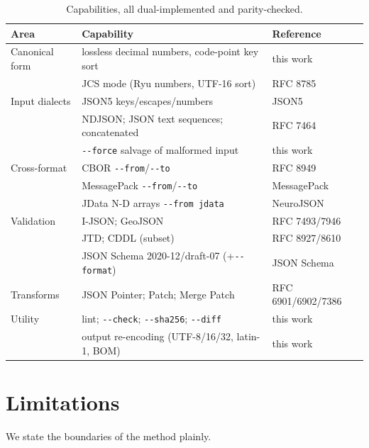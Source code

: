 \documentclass[11pt]{article}
\newcommand{\code}[1]{\texttt{#1}}
\begin{document}
\begin{table}[t]
\centering
\caption{Capabilities, all dual-implemented and parity-checked.}
\label{tab:features}
\small
\begin{tabular}{@{}lll@{}}
\toprule
Area & Capability & Reference \\
\midrule
Canonical form & lossless decimal numbers, code-point key sort & this work \\
                & JCS mode (Ryu numbers, UTF-16 sort) & RFC 8785 \\
Input dialects  & JSON5 keys/escapes/numbers & JSON5 \\
                & NDJSON; JSON text sequences; concatenated & RFC 7464 \\
                & \code{-{}-force} salvage of malformed input & this work \\
Cross-format    & CBOR \code{-{}-from}/\code{-{}-to} & RFC 8949 \\
                & MessagePack \code{-{}-from}/\code{-{}-to} & MessagePack \\
                & JData N-D arrays \code{-{}-from jdata} & NeuroJSON \\
Validation      & I-JSON; GeoJSON & RFC 7493/7946 \\
                & JTD; CDDL (subset) & RFC 8927/8610 \\
                & JSON Schema 2020-12/draft-07 (+\code{-{}-format}) & JSON Schema \\
Transforms      & JSON Pointer; Patch; Merge Patch & RFC 6901/6902/7386 \\
Utility         & lint; \code{-{}-check}; \code{-{}-sha256}; \code{-{}-diff} & this work \\
                & output re-encoding (UTF-8/16/32, latin-1, BOM) & this work \\
\bottomrule
\end{tabular}
\end{table}

\section{Limitations}\label{sec:limitations}

We state the boundaries of the method plainly.
\end{document}

